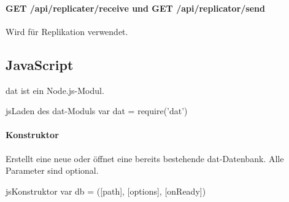\paragraph{GET /api/replicater/receive und GET /api/replicator/send}
Wird für Replikation verwendet.

\subsection{JavaScript}
dat ist ein Node.js-Modul.

\begin{srclst}{js}{Laden des dat-Moduls}
var dat = require('dat')
\end{srclst}

\paragraph{Konstruktor}

Erstellt eine neue oder öffnet eine bereits bestehende dat-Datenbank. Alle Parameter sind optional.

\begin{srclst}{js}{Konstruktor}
var db = ([path], [options], [onReady])
\end{srclst}

